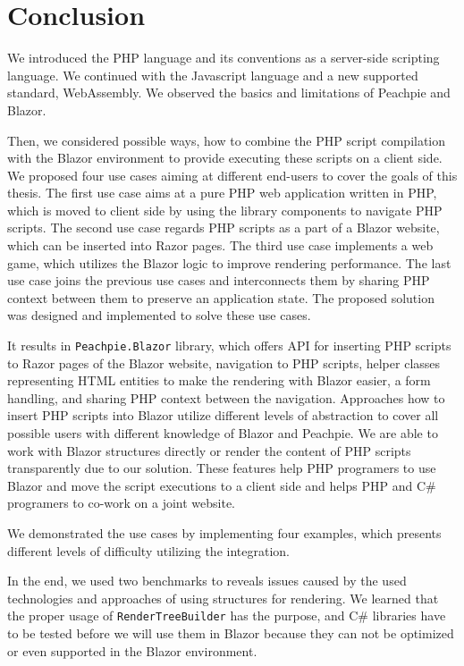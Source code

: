 \chapter*{Conclusion}

We introduced the PHP language and its conventions as a server-side scripting language.
We continued with the Javascript language and a new supported standard, WebAssembly.
We observed the basics and limitations of Peachpie and Blazor.
\par
Then, we considered possible ways, how to combine the PHP script compilation with the Blazor environment to provide executing these scripts on a client side.
We proposed four use cases aiming at different end-users to cover the goals of this thesis.
The first use case aims at a pure PHP web application written in PHP, which is moved to client side by using the library components to navigate PHP scripts.
The second use case regards PHP scripts as a part of a Blazor website, which can be inserted into Razor pages.
The third use case implements a web game, which utilizes the Blazor logic to improve rendering performance.
The last use case joins the previous use cases and interconnects them by sharing PHP context between them to preserve an application state.  
The proposed solution was designed and implemented to solve these use cases.
\par
It results in \texttt{Peachpie.Blazor} library, which offers API for inserting PHP scripts to Razor pages of the Blazor website, navigation to PHP scripts, helper classes representing HTML entities to make the rendering with Blazor easier, a form handling, and sharing PHP context between the navigation.
Approaches how to insert PHP scripts into Blazor utilize different levels of abstraction to cover all possible users with different knowledge of Blazor and Peachpie.
We are able to work with Blazor structures directly or render the content of PHP scripts transparently due to our solution.
These features help PHP programers to use Blazor and move the script executions to a client side and helps PHP and C\# programers to co-work on a joint website.
\par
We demonstrated the use cases by implementing four examples, which presents different levels of difficulty utilizing the integration.
\par
In the end, we used two benchmarks to reveals issues caused by the used technologies and approaches of using structures for rendering.
We learned that the proper usage of \texttt{RenderTreeBuilder} has the purpose, and C\# libraries have to be tested before we will use them in Blazor because they can not be optimized or even supported in the Blazor environment.

